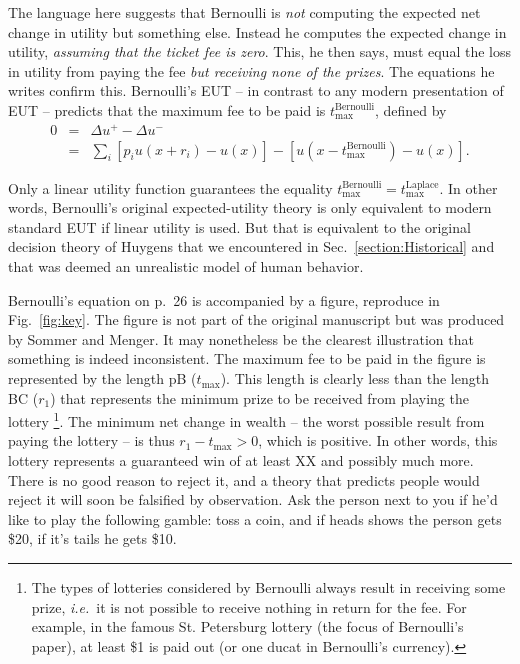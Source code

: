 \documentclass[dvips,draft]{ectaart}
\newcommand{\ie}{{\it i.e.}\ }
\newcommand{\elabel}[1]{\label{eq:#1}}
\newcommand{\fref}[1]{Fig.~\ref{fig:#1}}
\newcommand{\secref}[1]{Sec.~\ref{section:#1}}
\newcommand{\bea}{\begin{eqnarray}}
\newcommand{\eea}{\end{eqnarray}}
\newcommand{\Du}{\Delta u}
\newcommand{\tm}{{t_{\text{max}}}}
\newcommand{\tml}{{t_{\text{max}}^{\text{Laplace}}}}
\newcommand{\tmb}{{t_{\text{max}}^{\text{Bernoulli}}}}
\begin{document}
The language here suggests that Bernoulli is {\it not} computing the expected net change in utility but something else. Instead he computes the expected change in utility, {\it assuming that the ticket fee is zero}. This, he then says, must equal the loss in utility from paying the fee {\it but receiving none of the prizes}. The equations he writes confirm this. Bernoulli's EUT -- in contrast to any modern presentation of EUT -- predicts that the maximum fee to be paid is $\tmb$, defined by
\bea
0&=&\Du^+-\Du^-\\
&=&\sum_i [p_i u(x+r_i) -u(x)] - [u(x-\tmb) - u(x)].
\elabel{ub}
\eea

Only a linear utility function guarantees the equality $\tmb=\tml$. In other words, Bernoulli's original expected-utility theory is only equivalent to modern standard EUT if linear utility is used. But that is equivalent to the original decision theory of Huygens that we encountered in \secref{Historical} and that was deemed an unrealistic model of human behavior. 


Bernoulli's equation on p.~26 is accompanied by a figure, reproduce in \fref{key}. The figure is not part of the original manuscript but was produced by Sommer and Menger. It may nonetheless be the clearest illustration that something is indeed inconsistent. The maximum fee to be paid in the figure is represented by the length pB ($\tm$). This length is clearly less than the length BC ($r_1$) that represents the minimum prize to be received from playing the lottery \footnote{The types of lotteries considered by Bernoulli always result in receiving some prize, \ie it is not possible to receive nothing in return for the fee. For example, in the famous St. Petersburg lottery (the focus of Bernoulli's paper), at least \$1 is paid out (or one ducat in Bernoulli's currency).}. The minimum net change in wealth -- the worst possible result from paying the lottery -- is thus $r_1-\tm>0$, which is positive. In other words, this lottery represents a guaranteed win of at least XX and possibly much more. There is no good reason to reject it, and a theory that predicts people would reject it will soon be falsified by observation. Ask the person next to you if he'd like to play the following gamble: toss a coin, and if heads shows the person gets \$20, if it's tails he gets \$10.
\end{document}
